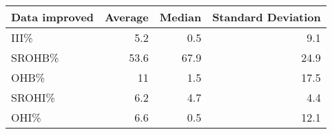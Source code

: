 \begin{tabular}{|l|r|r|r|}
\hline
 Data improved   &   Average &   Median &   Standard Deviation \\
\hline
 III\%            &       5.2 &      0.5 &                  9.1 \\
\hline
 SROHB\%          &      53.6 &     67.9 &                 24.9 \\
\hline
 OHB\%            &      11   &      1.5 &                 17.5 \\
\hline
 SROHI\%          &       6.2 &      4.7 &                  4.4 \\
\hline
 OHI\%            &       6.6 &      0.5 &                 12.1 \\
\hline
\end{tabular}
